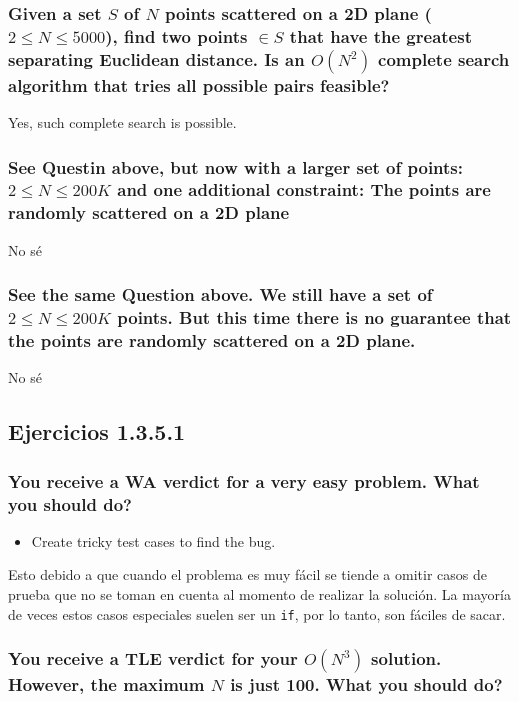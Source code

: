 \documentclass{article}
\begin{document}
\subsubsection{Given a set $S$ of $N$ points scattered on a 2D plane ($2 \leq N \leq 5000$), find two points $\in S$ that have the greatest separating Euclidean distance. Is an $O(N^{2})$ complete search algorithm that tries all possible pairs feasible?}

Yes, such complete search is possible.


\subsubsection{See Questin above, but now with a larger set of points: $2 \leq N \leq 200 K$ and one additional constraint: The points are randomly scattered on a 2D plane}

No sé


\subsubsection{See the same Question above. We still have a set of $2 \leq N \leq 200K$ points. But this time there is no guarantee that the points are randomly scattered on a 2D plane.}

No sé


\subsection{Ejercicios 1.3.5.1}


\subsubsection{You receive a WA verdict for a very easy problem. What you should do?}


\begin{itemize}
  \item Create tricky test cases to find the bug.
\end{itemize}

Esto debido a que cuando el problema es muy fácil se tiende a omitir casos de prueba que no se toman en cuenta al momento de realizar la solución. La mayoría de veces estos casos especiales suelen ser un \texttt{if}, por lo tanto, son fáciles de sacar.


\subsubsection{You receive a TLE verdict for your $O(N^{3})$ solution. However, the maximum $N$ is just 100. What you should do?}
\end{document}
